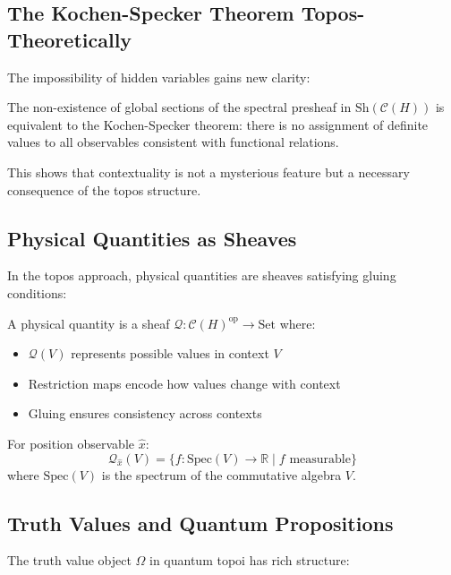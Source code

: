 \subsection{The Kochen-Specker Theorem Topos-Theoretically}

The impossibility of hidden variables gains new clarity:

\begin{theorem}
The non-existence of global sections of the spectral presheaf in $\text{Sh}(\mathcal{C}(H))$ is equivalent to the Kochen-Specker theorem: there is no assignment of definite values to all observables consistent with functional relations.
\end{theorem}

This shows that contextuality is not a mysterious feature but a necessary consequence of the topos structure.

\subsection{Physical Quantities as Sheaves}

In the topos approach, physical quantities are sheaves satisfying gluing conditions:

\begin{definition}
A physical quantity is a sheaf $\mathcal{Q}: \mathcal{C}(H)^{\text{op}} \to \text{Set}$ where:
\begin{itemize}
\item $\mathcal{Q}(V)$ represents possible values in context $V$
\item Restriction maps encode how values change with context
\item Gluing ensures consistency across contexts
\end{itemize}
\end{definition}

\begin{example}
For position observable $\hat{x}$:
\[
\mathcal{Q}_{\hat{x}}(V) = \{f: \text{Spec}(V) \to \mathbb{R} \mid f \text{ measurable}\}
\]
where $\text{Spec}(V)$ is the spectrum of the commutative algebra $V$.
\end{example}

\subsection{Truth Values and Quantum Propositions}

The truth value object $\Omega$ in quantum topoi has rich structure:

